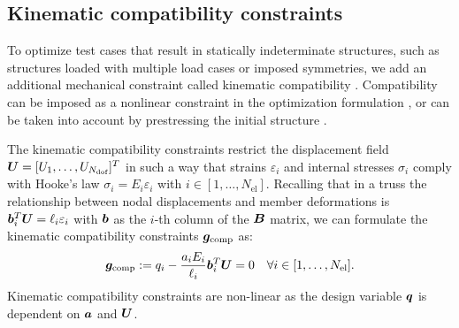 \subsection{Kinematic compatibility constraints}
To optimize test cases that result in statically indeterminate structures, such as structures loaded with multiple load cases or imposed symmetries, we add an additional mechanical constraint called kinematic compatibility . Compatibility can be imposed as a nonlinear constraint in the optimization formulation , or can be taken into account by prestressing the initial structure .

The kinematic compatibility constraints restrict the displacement field $\bm{U} = [U_1, \ldots,U_{N_{\text{dof}}}]^T$ in such a way that strains $\varepsilon_i$ and internal stresses $\sigma_i$ comply with Hooke's law $\sigma_i = E_i \varepsilon_i$ with $i \in [1,\ldots, N_{\text{el}}]$. Recalling that in a truss the relationship between nodal displacements and member deformations is $\bm{b}^T_i \bm{U} = \ell_i \varepsilon_i$ with $\bm{b}$ as the $i$-th column of the $\bm{B}$ matrix, we can formulate the kinematic compatibility constraints $\bm{g}_{\textrm{comp}}$ as:
\begin{equation}
\label{eq:04_compatib}
\bm{g}_{\textrm{comp}}:=q_i - \frac{a_i E_i}{\ell_i} \bm{b}_i^T\bm{U}  = 0  \quad \forall i \in [1,\ldots, N_{\text{el}}].
\end{equation}
Kinematic compatibility constraints are non-linear as the design variable $\bm{q}$ is dependent on $\bm{a}$ and $\bm{U}$.


